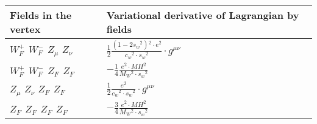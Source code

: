 \begin{center}
\begin{tabular}{|l|l|} \hline
Fields in the vertex & Variational derivative of Lagrangian by fields \\ \hline
$W^+_F{}_{}$ \phantom{-} $W^-_F{}_{}$ \phantom{-} ${Z}_{\mu }$ \phantom{-} ${Z}_{\nu }$ \phantom{-}  &
	$\frac{1}{2}\frac{ (1-2 s_w {}^2){}^2  \cdot e{}^2 }{ c_w{}^2  \cdot s_w{}^2 }\cdot g^{\mu \nu} $\\[2mm]
$W^+_F{}_{}$ \phantom{-} $W^-_F{}_{}$ \phantom{-} $Z_F{}_{}$ \phantom{-} $Z_F{}_{}$ \phantom{-}  &
	$-\frac{1}{4}\frac{ e{}^2  \cdot MH{}^2 }{ M_W{}^2  \cdot s_w{}^2 }$\\[2mm]
${Z}_{\mu }$ \phantom{-} ${Z}_{\nu }$ \phantom{-} $Z_F{}_{}$ \phantom{-} $Z_F{}_{}$ \phantom{-}  &
	$\frac{1}{2}\frac{ e{}^2 }{ c_w{}^2  \cdot s_w{}^2 }\cdot g^{\mu \nu} $\\[2mm]
$Z_F{}_{}$ \phantom{-} $Z_F{}_{}$ \phantom{-} $Z_F{}_{}$ \phantom{-} $Z_F{}_{}$ \phantom{-}  &
	$-\frac{3}{4}\frac{ e{}^2  \cdot MH{}^2 }{ M_W{}^2  \cdot s_w{}^2 }$\\ \hline
\end{tabular}

\end{center}


